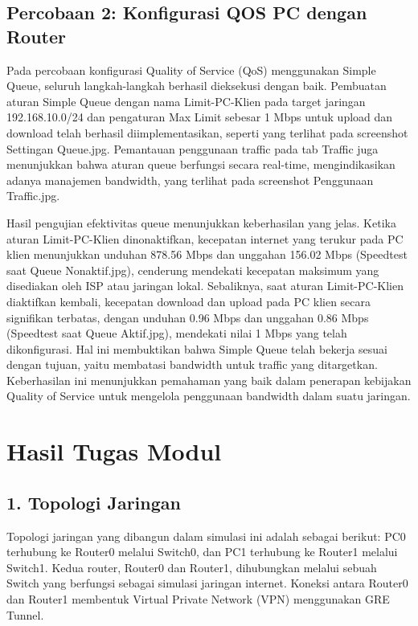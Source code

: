 \subsection*{Percobaan 2: Konfigurasi QOS PC dengan Router}

Pada percobaan konfigurasi Quality of Service (QoS) menggunakan Simple Queue, seluruh langkah-langkah berhasil dieksekusi dengan baik. Pembuatan aturan Simple Queue dengan nama Limit-PC-Klien pada target jaringan 192.168.10.0/24 dan pengaturan Max Limit sebesar 1 Mbps untuk upload dan download telah berhasil diimplementasikan, seperti yang terlihat pada screenshot Settingan Queue.jpg. Pemantauan penggunaan traffic pada tab Traffic juga menunjukkan bahwa aturan queue berfungsi secara real-time, mengindikasikan adanya manajemen bandwidth, yang terlihat pada screenshot Penggunaan Traffic.jpg.

Hasil pengujian efektivitas queue menunjukkan keberhasilan yang jelas. Ketika aturan Limit-PC-Klien dinonaktifkan, kecepatan internet yang terukur pada PC klien menunjukkan unduhan 878.56 Mbps dan unggahan 156.02 Mbps (Speedtest saat Queue Nonaktif.jpg), cenderung mendekati kecepatan maksimum yang disediakan oleh ISP atau jaringan lokal. Sebaliknya, saat aturan Limit-PC-Klien diaktifkan kembali, kecepatan download dan upload pada PC klien secara signifikan terbatas, dengan unduhan 0.96 Mbps dan unggahan 0.86 Mbps (Speedtest saat Queue Aktif.jpg), mendekati nilai 1 Mbps yang telah dikonfigurasi. Hal ini membuktikan bahwa Simple Queue telah bekerja sesuai dengan tujuan, yaitu membatasi bandwidth untuk traffic yang ditargetkan. Keberhasilan ini menunjukkan pemahaman yang baik dalam penerapan kebijakan Quality of Service untuk mengelola penggunaan bandwidth dalam suatu jaringan.
\section*{Hasil Tugas Modul}

\subsection*{1. Topologi Jaringan}
Topologi jaringan yang dibangun dalam simulasi ini adalah sebagai berikut: PC0 terhubung ke Router0 melalui Switch0, dan PC1 terhubung ke Router1 melalui Switch1. Kedua router, Router0 dan Router1, dihubungkan melalui sebuah Switch yang berfungsi sebagai simulasi jaringan internet. Koneksi antara Router0 dan Router1 membentuk Virtual Private Network (VPN) menggunakan GRE Tunnel.

